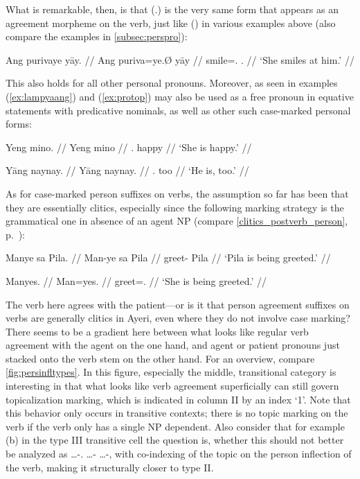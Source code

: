 \xe

What is remarkable, then, is that  (\TsgF{}.\Top{}) is the very 
same form that appears as an agreement morpheme on the verb, just like 
 (\TsgM{}) in various examples above (also compare the examples 
in \autoref{subsec:perspro}):

\ex %
\begingl
	\gla Ang purivaye yāy. //
	\glb Ang puriva=ye.Ø yāy //
	\glc \AgtT{} smile=\TsgF{}.\Top{} \TsgM{}.\Loc{} //
	\glft `She smiles at him.' //
\endgl\xe

This also holds for all other personal pronouns. Moreover, 
 as seen in examples (\ref{ex:lampyaang}) and 
(\ref{ex:protop}) may also be used as a free pronoun in equative statements 
with predicative nominals, as well as other such case-marked personal forms:

\pex %
\a\begingl
	\gla Yeng mino. //
	\glb Yeng mino //
	\glc \TsgF{}.\Aarg{} happy //
	\glft `She is happy.' //
\endgl
	
\a\begingl
	\gla Yāng naynay. //
	\glb Yāng naynay. //
	\glc \TsgM{}.\Aarg{} too //
	\glft `He is, too.' //
\endgl

\xe

\label{patagr} As for case-marked person suffixes on verbs, the
assumption so far has been  that they are essentially clitics, especially
since the following marking  strategy is the grammatical one in absence of an
agent NP (compare \autoref{clitics_postverb_person}, 
p.~\pageref{clitics_postverb_person}):

\pex\label{ex:passive} %
\a\label{ex:manye}\begingl
	\gla Manye sa Pila. //
	\glb Man-ye sa ​Pila //
	\glc greet-\TsgF{} \Parg{} ​Pila //
	\glft `Pila is being greeted.' //
\endgl
	
\a\label{ex:manyes}\begingl
	\gla Manyes. //
	\glb Man=yes. //
	\glc greet=\TsgF{}.\Parg{} //
	\glft `She is being greeted.' //
\endgl

\xe

The verb here agrees with the patient---or is it that person agreement suffixes
on verbs are generally clitics in Ayeri, even where they do not involve case
marking? There seems to be a gradient here between what looks like regular verb
agreement with the agent on the one hand, and agent or patient pronouns just
stacked onto the verb stem on the other hand. For an overview, compare
\autoref{fig:persinfltypes}. In this figure, especially the middle,
transitional category is interesting in that what looks like verb agreement
superficially can still govern topicalization marking, which is indicated in
column II by an index `1'. Note that this behavior only occurs in transitive
contexts; there is no topic marking on the verb if the verb only has a single
NP dependent. Also consider that for example (b) in the type III transitive
cell the question is, whether this should not better be analyzed as
\AgtT{} …-\TsgM{}.\Top{} …-\Top{} …-\Parg{}, with co-indexing of the topic on 
the person inflection of the verb, making it structurally closer to type II.

